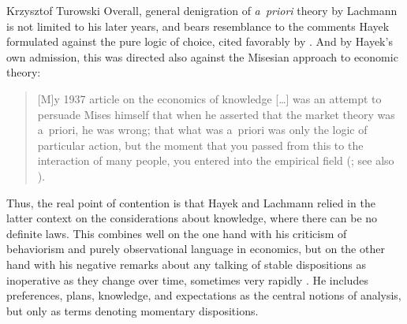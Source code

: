 \begin{artengenv}{Krzysztof Turowski}
Overall, general denigration of \emph{a~priori} theory by Lachmann is not limited to his later years, and bears resemblance to the comments Hayek formulated against the pure logic of choice, cited favorably by \textcite[57]{lachmann-significance}. And by Hayek's own admission, this was directed also against the Misesian approach to economic theory:
\begin{quote}
[M]y 1937 article on the economics of knowledge [\ldots] was an attempt to persuade Mises himself that when he asserted that the market theory was a~priori, he was wrong; that what was a~priori was only the logic of particular action, but the moment that you passed from this to the interaction of many people, you entered into the empirical field (\cite[72]{hayek-on-hayek}; see also \cite[Lachmann quoted in][35]{selgin}).
\end{quote}
Thus, the real point of contention is that Hayek and Lachmann relied in the latter context on the considerations about knowledge, where there can be no definite laws.
This combines well on the one hand with his criticism of behaviorism and purely observational language in economics, but on the other hand with his negative remarks about any talking of stable dispositions as inoperative as they change over time, sometimes very rapidly \parencite[11]{lachmann-weber}. He includes preferences, plans, knowledge, and expectations as the central notions of analysis, but only as terms denoting momentary dispositions.


\end{artengenv}
